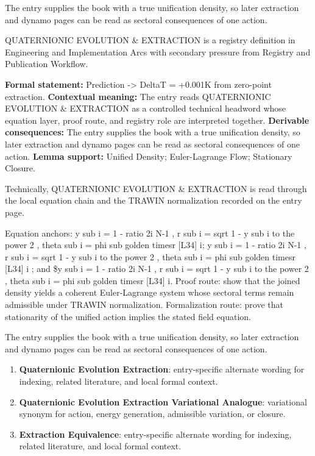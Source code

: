 The entry supplies the book with a true unification density, so later extraction and dynamo pages can be read as sectoral consequences of one action.
\clearpage


\begingroup\small
{}
QUATERNIONIC EVOLUTION \& EXTRACTION is a registry definition in Engineering and Implementation Arcs with secondary pressure from Registry and Publication Workflow.

\begingroup\footnotesize\setlength{\emergencystretch}{3em}\sloppy
\textbf{Formal statement:} Prediction -> DeltaT = +0.001K from zero-point extraction. \textbf{Contextual meaning:} The entry reads QUATERNIONIC EVOLUTION \& EXTRACTION as a controlled technical headword whose equation layer, proof route, and registry role are interpreted together. \textbf{Derivable consequences:} The entry supplies the book with a true unification density, so later extraction and dynamo pages can be read as sectoral consequences of one action. \textbf{Lemma support:} Unified Density; Euler-Lagrange Flow; Stationary Closure.\par
\endgroup

Technically, QUATERNIONIC EVOLUTION \& EXTRACTION is read through the local equation chain and the TRAWIN normalization recorded on the entry page.

Equation anchors: y sub i = 1 - ratio 2i N-1 , r sub i = sqrt 1 - y sub i to the power 2 , theta sub i = phi sub golden timesr [L34] i; y sub i = 1 - ratio 2i N-1 , r sub i = sqrt 1 - y sub i to the power 2 , theta sub i = phi sub golden timesr [L34] i ; and \$y sub i = 1 - ratio 2i N-1 , r sub i = sqrt 1 - y sub i to the power 2 , theta sub i = phi sub golden timesr [L34] i. Proof route: show that the joined density yields a coherent Euler-Lagrange system whose sectoral terms remain admissible under TRAWIN normalization. Formalization route: prove that stationarity of the unified action implies the stated field equation.

The entry supplies the book with a true unification density, so later extraction and dynamo pages can be read as sectoral consequences of one action.
\endgroup

\begin{enumerate}[leftmargin=1.6em,itemsep=6pt,topsep=4pt]
\item \textbf{Quaternionic Evolution Extraction}: entry-specific alternate wording for indexing, related literature, and local formal context.
\item \textbf{Quaternionic Evolution Extraction Variational Analogue}: variational synonym for action, energy generation, admissible variation, or closure.
\item \textbf{Extraction Equivalence}: entry-specific alternate wording for indexing, related literature, and local formal context.
\end{enumerate}

